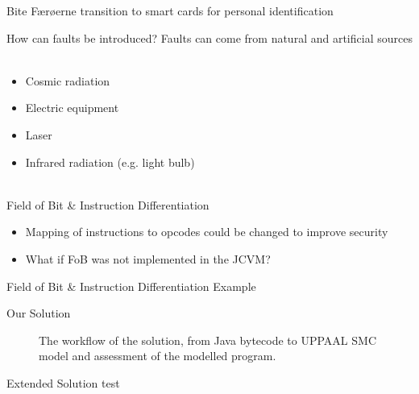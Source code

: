 


\begin{frame}[fragile]{Bite}
Færøerne transition to smart cards for personal identification
\end{frame}

\begin{frame}[fragile]{How can faults be introduced?}
Faults can come from natural and artificial sources\\~\\
	\begin{itemize}
	\item Cosmic radiation
	\item Electric equipment
	\item Laser
	\item Infrared radiation (e.g. light bulb)\\~\\
	\end{itemize}
\end{frame}

\begin{frame}[fragile]{Field of Bit \& Instruction Differentiation}
\begin{itemize}
\item Mapping of instructions to opcodes could be changed to improve security
\item What if FoB was not implemented in the JCVM?
\end{itemize}
\end{frame}

\begin{frame}[fragile]{Field of Bit \& Instruction Differentiation}
Example
\end{frame}

\begin{frame}[fragile]{Our Solution}
\begin{figure}
\centering
\def\svgwidth{\columnwidth}

\caption{The workflow of the solution, from Java bytecode to UPPAAL SMC model and assessment of the modelled program.}
\label{fig:workflow_new}
\end{figure}
\end{frame}


\begin{frame}[fragile]{Extended Solution}
test
\end{frame}